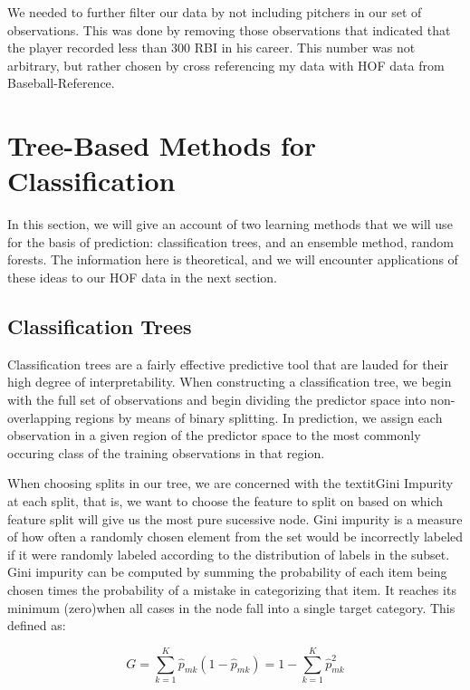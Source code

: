 \documentclass[preprint,12pt]{elsarticle}
\begin{document}
We needed to further filter our data by not including pitchers in our set of observations. This was done by removing those observations that indicated that the player recorded less than 300 RBI in his career. This number was not arbitrary, but rather chosen by cross referencing my data with HOF data from Baseball-Reference.




\section{Tree-Based Methods for Classification}

In this section, we will give an account of two learning methods that we will use for the basis of prediction: classification trees, and an ensemble method, random forests. The information here is theoretical, and we will encounter applications of these ideas to our HOF data in the next section.

\subsection{Classification Trees}
Classification trees are a fairly effective predictive tool that are lauded for their high degree of interpretability. When constructing a classification tree, we begin with the full set of observations and begin dividing the predictor space into non-overlapping regions by means of binary splitting. In prediction, we assign each observation in a given region of the predictor space to the most commonly occuring class of the training observations in that region. 

When choosing splits in our tree, we are concerned with the textit{Gini Impurity} at each split, that is, we want to choose the feature to split on based on which feature split will give us the most pure sucessive node. Gini impurity is a measure of how often a randomly chosen element from the set would be incorrectly labeled if it were randomly labeled according to the distribution of labels in the subset. Gini impurity can be computed by summing the probability of each item being chosen times the probability of a mistake in categorizing that item. It reaches its minimum (zero)when all cases in the node fall into a single target category. This defined as:

$$G = \sum\limits_{k=1}^K \hat{p}_{mk}(1-\hat{p}_{mk}) = 1 - \sum\limits_{k=1}^K \hat{p}_{mk}^{2}$$
\end{document}
